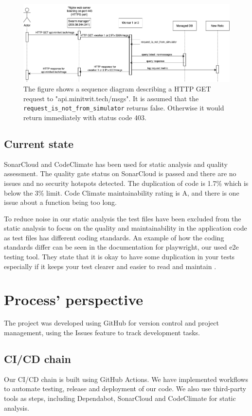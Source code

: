 \documentclass{article}
\begin{document}
\begin{figure}[H]
    \centering
    \includegraphics[width=\textwidth]{images/api-sequence.png}
    \caption{The figure shows a sequence diagram describing a HTTP GET request to "api.minitwit.tech/msgs". It is assumed that the \texttt{request\_is\_not\_from\_simulator} returns false. Otherwise it would return immediately with status code 403.}
    \label{fig:sequence_api}
\end{figure}


\subsection{Current state}
SonarCloud and CodeClimate has been used for static analysis and quality assessment. 
The quality gate status on SonarCloud is passed and there are no issues and no security hotspots detected. The duplication of code is 1.7\% which is below the 3\% limit. Code Climate maintainability rating is A, and there is one issue about a function being too long. 

To reduce noise in our static analysis the test files have been excluded from the static analysis to focus on the quality and maintainability in the application code as test files has different coding standards. An example of how 
the coding standards differ can be seen in the documentation for playwright, our used e2e testing tool. They state that it is okay to have some duplication in your tests especially if it keeps your test clearer and easier to read and maintain \cite{playwright_best_practices}. 


\section{Process' perspective}
The project was developed using GitHub for version control and project management, using the Issues feature to track development tasks.


\subsection{CI/CD chain}
Our CI/CD chain is built using GitHub Actions. We have implemented workflows to automate testing, release and deployment of our code. We also use third-party tools as steps, including Dependabot, SonarCloud and CodeClimate for static analysis.
\end{document}
